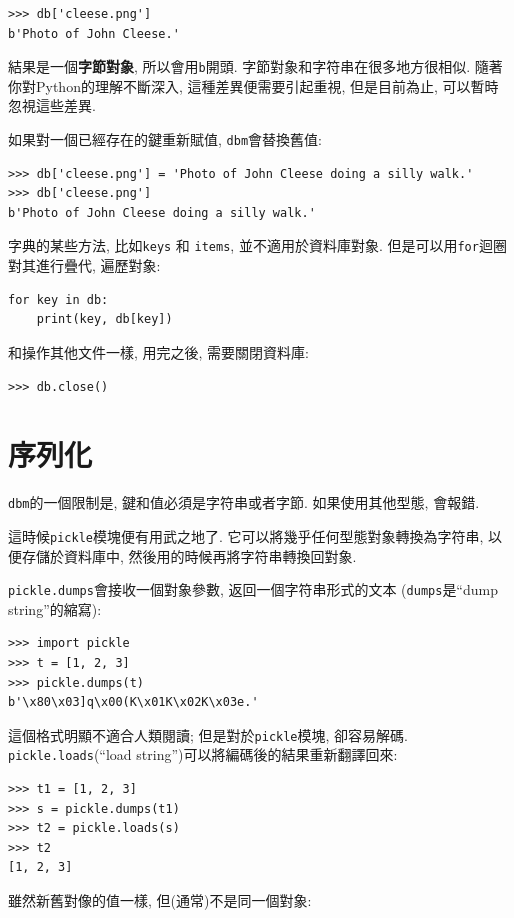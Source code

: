 \documentclass[10pt]{book}
\begin{document}
\begin{verbatim}
>>> db['cleese.png']
b'Photo of John Cleese.'
\end{verbatim}
%
結果是一個{\bf 字節對象}, 所以會用{\tt b}開頭. 
字節對象和字符串在很多地方很相似. 
隨著你對Python的理解不斷深入, 這種差異便需要引起重視, 但是目前為止, 
可以暫時忽視這些差異. 

如果對一個已經存在的鍵重新賦值, {\tt dbm}會替換舊值:

\begin{verbatim}
>>> db['cleese.png'] = 'Photo of John Cleese doing a silly walk.'
>>> db['cleese.png']
b'Photo of John Cleese doing a silly walk.'
\end{verbatim}
%

字典的某些方法, 比如{\tt keys} 和 {\tt items}, 
並不適用於資料庫對象. 但是可以用{\tt for}迴圈對其進行疊代, 遍歷對象:

\begin{verbatim}
for key in db:
    print(key, db[key])
\end{verbatim}
%
和操作其他文件一樣, 用完之後, 需要關閉資料庫:

\begin{verbatim}
>>> db.close()
\end{verbatim}
%


\section{序列化}

{\tt dbm}的一個限制是, 鍵和值必須是字符串或者字節. 
如果使用其他型態, 會報錯. 
 

這時候{\tt pickle}模塊便有用武之地了. 
它可以將幾乎任何型態對象轉換為字符串, 以便存儲於資料庫中, 
然後用的時候再將字符串轉換回對象. 

{\tt pickle.dumps}會接收一個對象參數, 返回一個字符串形式的文本
({\tt dumps}是``dump string''的縮寫):

\begin{verbatim}
>>> import pickle
>>> t = [1, 2, 3]
>>> pickle.dumps(t)
b'\x80\x03]q\x00(K\x01K\x02K\x03e.'
\end{verbatim}
%

這個格式明顯不適合人類閱讀; 但是對於{\tt pickle}模塊, 卻容易解碼. 
{\tt pickle.loads}(``load string'')可以將編碼後的結果重新翻譯回來:

\begin{verbatim}
>>> t1 = [1, 2, 3]
>>> s = pickle.dumps(t1)
>>> t2 = pickle.loads(s)
>>> t2
[1, 2, 3]
\end{verbatim}
%
雖然新舊對像的值一樣, 但(通常)不是同一個對象:
\end{document}
